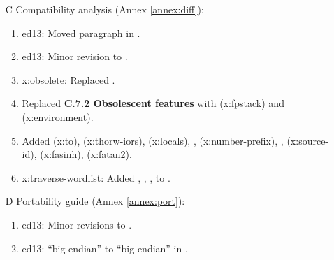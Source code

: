 \begin{itemize}
	\item[C] Compatibility analysis (Annex \ref{annex:diff}):	%
		\begin{enumerate}
		\item \textsf{ed13}: Moved paragraph in .
		\item \textsf{ed13}: Minor revision to .
		\item \textsf{x:obsolete}: Replaced .
		\item Replaced \textbf{C.7.2 Obsolescent features} with
			 (\textsf{x:fpstack}) and
			 (\textsf{x:environment}).
		\item Added
					(\textsf{x:to}),
					(\textsf{x:thorw-iors}),
					(\textsf{x:locals}),
			,	(\textsf{x:number-prefix}),
			,	(\textsf{x:source-id}),
				(\textsf{x:fasinh}),
				(\textsf{x:fatan2}).
		\item \textsf{x:traverse-wordlist}: Added ,
			, , \linebreak
			 to .
	\end{enumerate}

	\item[D] Portability guide (Annex \ref{annex:port}):			%
		\begin{enumerate}
		\item \textsf{ed13}: Minor revisions to .
		\item \textsf{ed13}: ``big endian'' to ``big-endian'' in .
		\end{enumerate}
	\end{itemize}
\endinput

